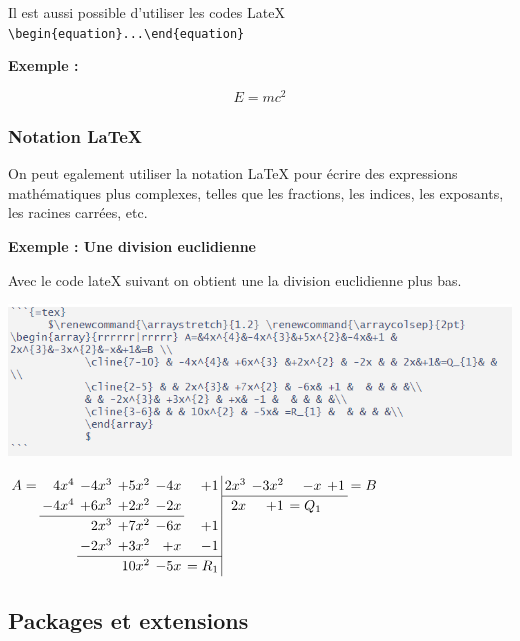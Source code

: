 \documentclass[
  12pt,
]{article}
\begin{document}
Il est aussi possible d'utiliser les codes LateX
\texttt{\textbackslash{}begin\{equation\}...\textbackslash{}end\{equation\}}

\textbf{Exemple :}

\begin{equation}
E = mc^2
\end{equation}

\subsubsection{Notation LaTeX}\label{notation-latex}

On peut egalement utiliser la notation LaTeX pour écrire des expressions
mathématiques plus complexes, telles que les fractions, les indices, les
exposants, les racines carrées, etc.

\textbf{Exemple : Une division euclidienne}

Avec le code lateX suivant on obtient une la division euclidienne plus
bas.

\begin{center}\includegraphics[width=0.8\linewidth,height=0.8\textheight]{../Document_Rmarkdown/Images/division_euclidienne} \end{center}

      $\renewcommand{\arraystretch}{1.2} \renewcommand{\arraycolsep}{2pt} \begin{array}{rrrrrr|rrrrr} A=&4x^{4}&-4x^{3}&+5x^{2}&-4x&+1 & 2x^{3}&-3x^{2}&-x&+1&=B \\  
            \cline{7-10} & -4x^{4}& +6x^{3} &+2x^{2} & -2x & & 2x&+1&=Q_{1}& & \\ 
            \cline{2-5} & & 2x^{3}& +7x^{2} & -6x& +1 &  & & & &\\
            & & -2x^{3}& +3x^{2} & +x& -1 &  & & & &\\
            \cline{3-6}& & & 10x^{2} & -5x& =R_{1} &  & & & &\\
            \end{array}
            $ 

\subsection{Packages et extensions}\label{packages-et-extensions}
\end{document}
